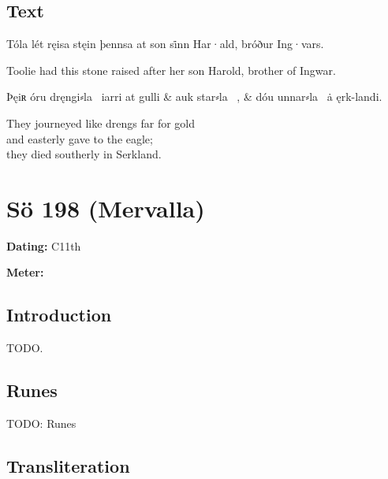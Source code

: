 \subsection{Text}

\bpg\bpa[0]%
\startsub Tóla lét ręisa stęin þennsa at son si̇nn Har·ald, bróður Ing·vars.\endsub\epa

\bpb Toolie had this stone raised after her son Harold, brother of Ingwar.\epb\epg

\bvg\bva[][2]%
Þęiʀ óru dręngi⸗la \hld\ iarri at gulli &
auk star⸗la \hld\ , &
dóu unnar⸗la \hld\ ȧ ęrk-landi.\eva

\bvb They journeyed like drengs far for gold \\
and easterly gave to the eagle; \\
they died southerly in Serkland.\evb\evg

\sectionline\clearpage


\section{Sö 198 (Mervalla)}

\begin{flushright}%
\textbf{Dating:} C11th

\textbf{Meter:} \Fornyrdislag
\end{flushright}%

\subsection{Introduction}

TODO.

\subsection{Runes}

TODO: Runes%

\subsection{Transliteration}

